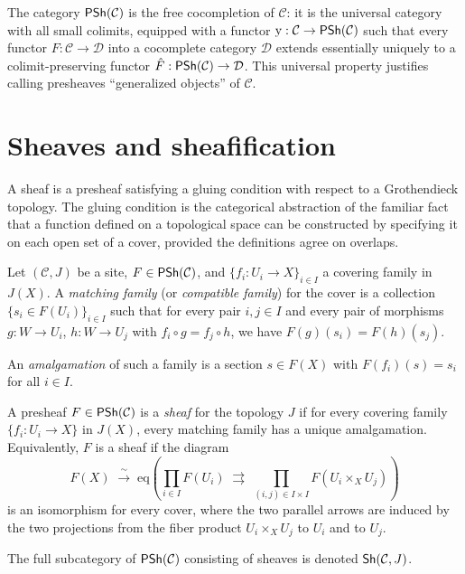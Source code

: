 \begin{remark}
\label{rem:free-cocompletion}
The category $\mathsf{PSh}(\mathcal{C})$ is the free cocompletion of
$\mathcal{C}$: it is the universal category with all small colimits,
equipped with a functor $\mathrm{y} : \mathcal{C} \to \mathsf{PSh}(\mathcal{C})$
such that every functor $F : \mathcal{C} \to \mathcal{D}$ into a
cocomplete category $\mathcal{D}$ extends essentially uniquely to a
colimit-preserving functor $\hat{F} : \mathsf{PSh}(\mathcal{C}) \to \mathcal{D}$.
This universal property justifies calling presheaves ``generalized
objects'' of $\mathcal{C}$.
\end{remark}



\section{Sheaves and sheafification}
\label{sec:sites:sheaves}

A sheaf is a presheaf satisfying a gluing condition with respect to a
Grothendieck topology.  The gluing condition is the categorical
abstraction of the familiar fact that a function defined on a
topological space can be constructed by specifying it on each open set
of a cover, provided the definitions agree on overlaps.

\begin{definition}
\label{def:matching-family}
Let $(\mathcal{C}, J)$ be a site, $F \in \mathsf{PSh}(\mathcal{C})$, and
$\{f_i : U_i \to X\}_{i \in I}$ a covering family in $J(X)$.  A
\emph{matching family} (or \emph{compatible family}) for the cover is
a collection $\{s_i \in F(U_i)\}_{i \in I}$ such that for every pair
$i, j \in I$ and every pair of morphisms
$g : W \to U_i$, $h : W \to U_j$ with $f_i \circ g = f_j \circ h$,
we have $F(g)(s_i) = F(h)(s_j)$.

An \emph{amalgamation} of such a family is a section $s \in F(X)$ with
$F(f_i)(s) = s_i$ for all $i \in I$.
\end{definition}

\begin{definition}[Sheaf]
\label{def:sheaf}
A presheaf $F \in \mathsf{PSh}(\mathcal{C})$ is a \emph{sheaf} for the
topology $J$ if for every covering family $\{f_i : U_i \to X\}$ in $J(X)$,
every matching family has a unique amalgamation.  Equivalently, $F$
is a sheaf if the diagram
\[
  F(X) \;\xrightarrow{\;\sim\;}\;
  \mathrm{eq}\!\left(
    \prod_{i \in I} F(U_i) \;\rightrightarrows\;
    \prod_{(i,j) \in I \times I} F(U_i \times_X U_j)
  \right)
\]
is an isomorphism for every cover, where the two parallel arrows are
induced by the two projections from the fiber product
$U_i \times_X U_j$ to $U_i$ and to $U_j$.

The full subcategory of $\mathsf{PSh}(\mathcal{C})$ consisting of sheaves is
denoted $\mathsf{Sh}(\mathcal{C}, J)$.
\end{definition}

